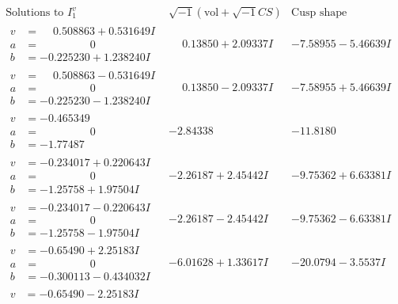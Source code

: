 \documentclass[1p]{elsarticle_modified}
\theoremstyle{definition}
\newcommand{\I}{\sqrt{-1}}
\begin{document}
$$\begin{array}{c|c|c}  
\text{Solutions to }I^v_{1}& \I (\text{vol} + \sqrt{-1}CS) & \text{Cusp shape}\\
 \hline 
\begin{aligned}
v &= \phantom{-}0.508863 + 0.531649 I \\
a &= \phantom{-0.000000 } 0 \\
b &= -0.225230 + 1.238240 I\end{aligned}
 & \phantom{-}0.13850 + 2.09337 I & -7.58955 - 5.46639 I \\ \hline\begin{aligned}
v &= \phantom{-}0.508863 - 0.531649 I \\
a &= \phantom{-0.000000 } 0 \\
b &= -0.225230 - 1.238240 I\end{aligned}
 & \phantom{-}0.13850 - 2.09337 I & -7.58955 + 5.46639 I \\ \hline\begin{aligned}
v &= -0.465349\phantom{ +0.000000I} \\
a &= \phantom{-0.000000 } 0 \\
b &= -1.77487\phantom{ +0.000000I}\end{aligned}
 & -2.84338\phantom{ +0.000000I} & -11.8180\phantom{ +0.000000I} \\ \hline\begin{aligned}
v &= -0.234017 + 0.220643 I \\
a &= \phantom{-0.000000 } 0 \\
b &= -1.25758 + 1.97504 I\end{aligned}
 & -2.26187 + 2.45442 I & -9.75362 + 6.63381 I \\ \hline\begin{aligned}
v &= -0.234017 - 0.220643 I \\
a &= \phantom{-0.000000 } 0 \\
b &= -1.25758 - 1.97504 I\end{aligned}
 & -2.26187 - 2.45442 I & -9.75362 - 6.63381 I \\ \hline\begin{aligned}
v &= -0.65490 + 2.25183 I \\
a &= \phantom{-0.000000 } 0 \\
b &= -0.300113 - 0.434032 I\end{aligned}
 & -6.01628 + 1.33617 I & -20.0794 - 3.5537 I \\ \hline\begin{aligned}
v &= -0.65490 - 2.25183 I \\

\end{aligned}
\end{array}$$
\end{document}
